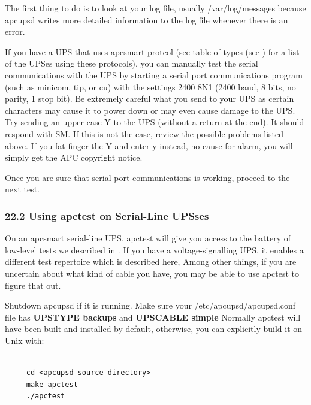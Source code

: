 The first thing to do is to look at your log file, usually /var/log/messages
because apcupsd writes more detailed information to the log file whenever
there is an error.  

If you have a UPS that uses apcsmart protcol (see table of types (see 
) for a list of the UPSes using
these protocols), you can manually test the serial communications with the UPS
by starting a serial port communications program (such as minicom, tip, or cu)
with the settings 2400 8N1 (2400 baud, 8 bits, no parity, 1 stop bit). Be
extremely careful what you send to your UPS as certain characters may cause it
to power down or may even cause damage to the UPS. Try sending an upper case Y
to the UPS (without a return at the end). It should respond with SM. If this
is not the case, review the possible problems listed above. If you fat finger
the Y and enter y instead, no cause for alarm, you will simply get the APC
copyright notice.  

Once you are sure that serial port communications is working, proceed to the
next test. 

\label{Using-apctest-on-Serial_002dLine-UPSses}

\subsubsection*{22.2 Using apctest on Serial-Line UPSses}

\label{index-apctest-222}
\label{index-Testing_002c-with-apctest-223}
On an apcsmart serial-line UPS, apctest will give you access to the battery of
low-level tests we described in 
.  If you have a voltage-signalling UPS, it
enables a different test repertoire which is described here, Among other
things, if you are uncertain about what kind of cable you have, you may be
able to use apctest to figure that out.  

Shutdown apcupsd if it is running. Make sure your /etc/apcupsd/apcupsd.conf
file has {\bf UPSTYPE backups} and {\bf UPSCABLE simple} Normally apctest will
have been built and installed by default, otherwise, you can explicitly build
it on Unix with: 

\footnotesize
\begin{verbatim}
     
     cd <apcupsd-source-directory>
     make apctest
     ./apctest
\end{verbatim}
\normalsize


